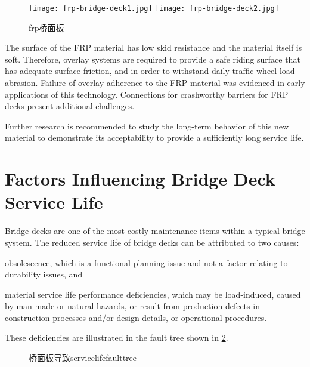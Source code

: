 \begin{figure}
  \texttt{[image: frp-bridge-deck1.jpg]}\hfill
  \texttt{[image: frp-bridge-deck2.jpg]}
  \caption{\acrshort*{frp}桥面板}
  \label{fig:frp-bridge-deck}
\end{figure}

The surface of the FRP material has low skid resistance and the material itself is soft. Therefore, overlay systems are required to provide a safe riding surface that has adequate surface friction, and in order to withstand daily traffic wheel load abrasion. Failure of overlay adherence to the FRP material was evidenced in early applications of this technology. Connections for crashworthy barriers for FRP decks present additional challenges.

Further research is recommended to study the long-term behavior of this new material to demonstrate its acceptability to provide a sufficiently long service life.

\section{Factors Influencing Bridge Deck Service Life}
\label{sec:factors-influence}

Bridge decks are one of the most costly maintenance items within a typical bridge system. The reduced service life of bridge decks can be attributed to two causes: 
\begin{enumerate*}
  \item obsolescence, which is a functional planning issue and not a factor relating to durability issues, and 
  \item material service life performance deficiencies, which may be load-induced, caused by man-made or natural hazards, or result from production defects in construction processes and/or design details, or operational procedures. 
\end{enumerate*}
These deficiencies are illustrated in the fault tree shown in \cref{fig:fault-tree-bridge-deck}.

\begin{figure}
  \caption{桥面板导致\gls*{servicelife}\gls*{faulttree}}
  \label{fig:fault-tree-bridge-deck}
\end{figure}

